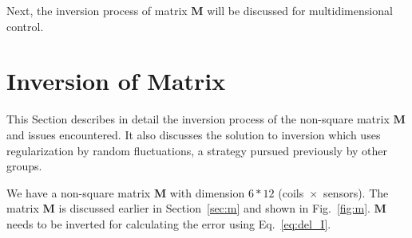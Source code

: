Next, the inversion process of matrix $\bm{M}$ will be discussed for multidimensional control.


\section{Inversion of Matrix}\label{sec:inv}

This Section describes in detail the inversion process of the non-square matrix $\bm{M}$ and issues encountered. It also discusses the solution to inversion which uses regularization by random fluctuations, a strategy pursued previously by other groups. 


We have a non-square matrix $\bm{M}$ with dimension $6*12$ (coils~$\times$~sensors). The matrix $\bm{M}$ is discussed earlier in Section~\ref{sec:m} and shown in Fig.~\ref{fig:m}. $\bm{M}$ needs to be inverted for calculating the error using Eq.~\ref{eq:del_I}.






